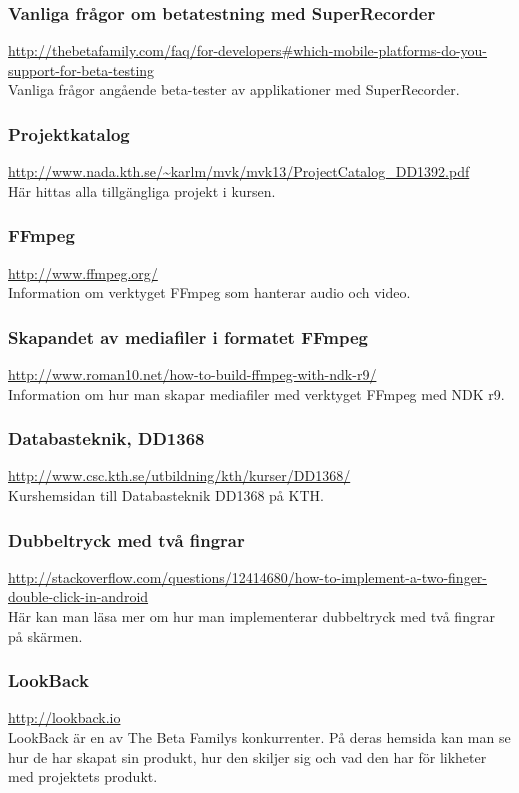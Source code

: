 \subsubsection{Vanliga frågor om betatestning med SuperRecorder}
\url{http://thebetafamily.com/faq/for-developers\#which-mobile-platforms-do-you-support-for-beta-testing} \\
Vanliga frågor angående beta-tester av applikationer med SuperRecorder.

\subsubsection{Projektkatalog}
\url{http://www.nada.kth.se/~karlm/mvk/mvk13/ProjectCatalog_DD1392.pdf} \\
Här hittas alla tillgängliga projekt i kursen.

\subsubsection{FFmpeg}
\url{http://www.ffmpeg.org/} \\
Information om verktyget FFmpeg som hanterar audio och video.

\subsubsection{Skapandet av mediafiler i formatet FFmpeg}
\url{http://www.roman10.net/how-to-build-ffmpeg-with-ndk-r9/} \\
Information om hur man skapar mediafiler med verktyget FFmpeg med NDK r9.

\subsubsection{Databasteknik, DD1368}
\url{http://www.csc.kth.se/utbildning/kth/kurser/DD1368/} \\
Kurshemsidan till Databasteknik DD1368 på KTH.

\subsubsection{Dubbeltryck med två fingrar}
\url{http://stackoverflow.com/questions/12414680/how-to-implement-a-two-finger-double-click-in-android} \\
Här kan man läsa mer om hur man implementerar dubbeltryck med två fingrar på skärmen.

\subsubsection{LookBack}
\url{http://lookback.io} \\
LookBack är en av The Beta Familys konkurrenter. På deras hemsida kan man se hur de har skapat sin produkt, hur den skiljer sig och vad den har för likheter med projektets produkt.

